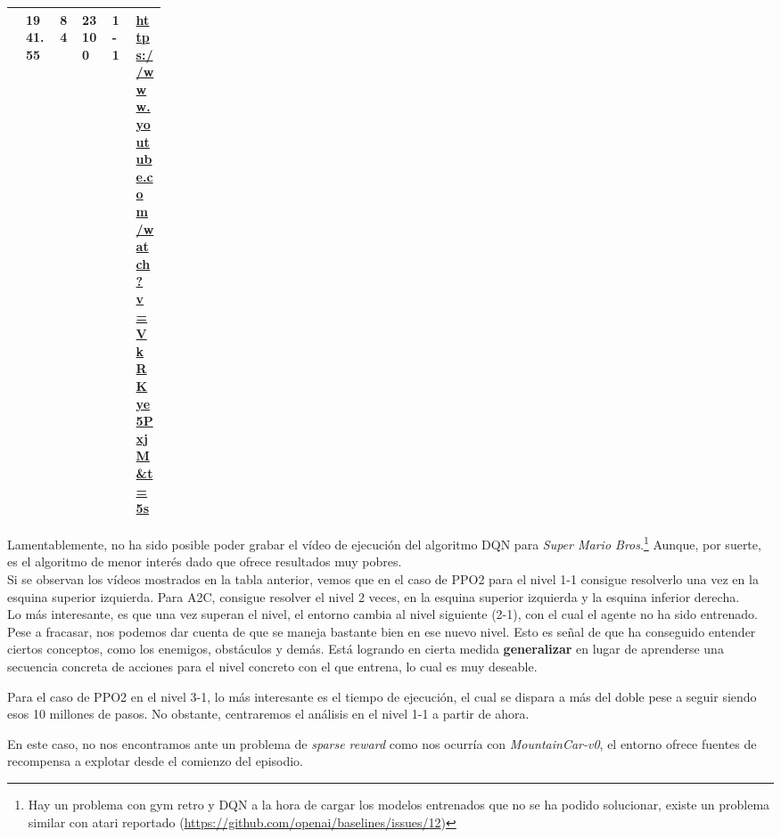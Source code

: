 \documentclass[11pt,fleqn]{book} %
\begin{document}
\begin{table}[H]
\begin{tabular}{l|l|l|l|l|p{0.2\linewidth}|}
		\rowcolor[HTML]{FFFFFF} 
		                    & 1941.55                                                                                                           & 84                                                                                   & 23100                                                                                                              & 1-1                                                                                                                & \url{https://www.youtube.com/watch?v=VkRKye5PxjM&t=5s}                                \\ \hline
	\end{tabular}
\end{table}

Lamentablemente, no ha sido posible poder grabar el vídeo de ejecución del algoritmo DQN para \textit{Super Mario Bros}.\footnote{Hay un problema con gym retro y DQN a la hora de cargar los modelos entrenados que no se ha podido solucionar, existe un problema similar con atari reportado (\url{https://github.com/openai/baselines/issues/12})} Aunque, por suerte, es el algoritmo de menor interés dado que ofrece resultados muy pobres. \\

Si se observan los vídeos mostrados en la tabla anterior, vemos que en el caso de PPO2 para el nivel 1-1 consigue resolverlo una vez en la esquina superior izquierda. Para A2C, consigue resolver el nivel 2 veces, en la esquina superior izquierda y la esquina inferior derecha. \\

Lo más interesante, es que una vez superan el nivel, el entorno cambia al nivel siguiente (2-1), con el cual el agente no ha sido entrenado. Pese a fracasar, nos podemos dar cuenta de que se maneja bastante bien en ese nuevo nivel. Esto es señal de que ha conseguido entender ciertos conceptos, como los enemigos, obstáculos y demás. Está logrando en cierta medida \textbf{generalizar} en lugar de aprenderse una secuencia concreta de acciones para el nivel concreto con el que entrena, lo cual es muy deseable.

Para el caso de PPO2 en el nivel 3-1, lo más interesante es el tiempo de ejecución, el cual se dispara a más del doble pese a seguir siendo esos 10 millones de pasos. No obstante, centraremos el análisis en el nivel 1-1 a partir de ahora. 

En este caso, no nos encontramos ante un problema de \textit{sparse reward} como nos ocurría con \textit{MountainCar-v0}, el entorno ofrece fuentes de recompensa a explotar desde el comienzo del episodio.
\end{document}

